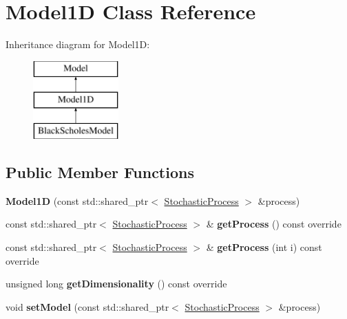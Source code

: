 \hypertarget{class_model1_d}{}\section{Model1D Class Reference}
\label{class_model1_d}
Inheritance diagram for Model1D\+:\begin{figure}[H]
\begin{center}
\leavevmode
\includegraphics[height=3.000000cm]{class_model1_d}
\end{center}
\end{figure}
\subsection*{Public Member Functions}
\begin{DoxyCompactItemize}
\item 
\hypertarget{class_model1_d_aca6508f11a4b419dacdc830afbe0af36}{}\label{class_model1_d_aca6508f11a4b419dacdc830afbe0af36} 
{\bfseries Model1D} (const std\+::shared\+\_\+ptr$<$ \hyperlink{class_stochastic_process}{Stochastic\+Process} $>$ \&process)
\item 
\hypertarget{class_model1_d_ae3cdfcb2922f03a68b8e8e02d572746f}{}\label{class_model1_d_ae3cdfcb2922f03a68b8e8e02d572746f} 
const std\+::shared\+\_\+ptr$<$ \hyperlink{class_stochastic_process}{Stochastic\+Process} $>$ \& {\bfseries get\+Process} () const override
\item 
\hypertarget{class_model1_d_a08b3a9f594214b5e3bcba3fe5f63524e}{}\label{class_model1_d_a08b3a9f594214b5e3bcba3fe5f63524e} 
const std\+::shared\+\_\+ptr$<$ \hyperlink{class_stochastic_process}{Stochastic\+Process} $>$ \& {\bfseries get\+Process} (int i) const override
\item 
\hypertarget{class_model1_d_ac81875523be6153cb58d0f37914eb9a1}{}\label{class_model1_d_ac81875523be6153cb58d0f37914eb9a1} 
unsigned long {\bfseries get\+Dimensionality} () const override
\item 
\hypertarget{class_model1_d_af0665a1beba2852b5382d4590e9fbbce}{}\label{class_model1_d_af0665a1beba2852b5382d4590e9fbbce} 
void {\bfseries set\+Model} (const std\+::shared\+\_\+ptr$<$ \hyperlink{class_stochastic_process}{Stochastic\+Process} $>$ \&process)
\end{DoxyCompactItemize}
